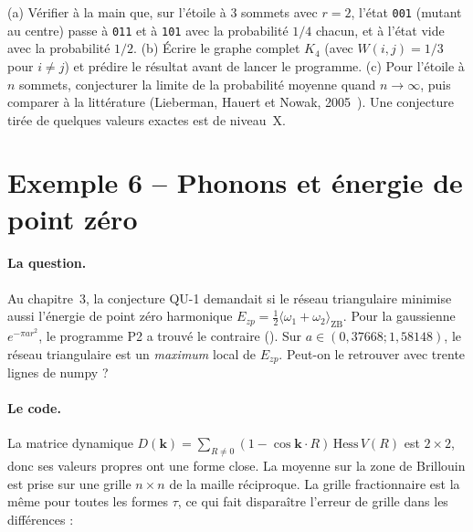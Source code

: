 \begin{exercise}[Exemple 5]\label{appF:exo5}
(a) Vérifier à la main que, sur l'étoile à 3 sommets avec $r=2$, l'état \texttt{001} (mutant au centre) passe à
\texttt{011} et à \texttt{101} avec la probabilité $1/4$ chacun, et à l'état vide avec la probabilité $1/2$. (b) Écrire
le graphe complet $K_4$ (avec $W(i,j)=1/3$ pour $i\ne j$) et prédire le résultat avant de lancer le programme. (c) Pour
l'étoile à $n$ sommets, conjecturer la limite de la probabilité moyenne quand $n\to\infty$, puis comparer à la littérature
(Lieberman, Hauert et Nowak, 2005~\cite{app:lhn}). Une conjecture tirée de quelques valeurs exactes est de niveau~X.
\end{exercise}

\section{Exemple 6 -- Phonons et énergie de point zéro}\label{appF:ex6}

\paragraph{La question.} Au chapitre~3, la conjecture QU-1 demandait si le réseau triangulaire minimise aussi
l'énergie de point zéro harmonique $E_{zp}=\tfrac12\langle\omega_1+\omega_2\rangle_{\mathrm{ZB}}$. Pour la gaussienne
$e^{-\pi ar^2}$, le programme P2 a trouvé le contraire (\tierX). Sur $a\in(0{,}37668;1{,}58148)$, le réseau
triangulaire est un \emph{maximum} local de $E_{zp}$. Peut-on le retrouver avec trente lignes de numpy ?

\paragraph{Le code.} La matrice dynamique $D(\mathbf k)=\sum_{R\ne0}(1-\cos\mathbf k\cdot R)\,\mathrm{Hess}\,V(R)$ est
$2\times2$, donc ses valeurs propres ont une forme close. La moyenne sur la zone de Brillouin est prise sur une grille
$n\times n$ de la maille réciproque. La grille fractionnaire est la même pour toutes les formes $\tau$, ce qui fait
disparaître l'erreur de grille dans les différences :


